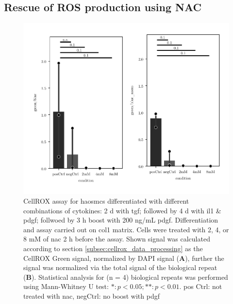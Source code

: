     \subsection{Rescue of ROS production using NAC}
        \begin{figure}[h!]
    \capstart
        \centering
    	\includegraphics{Abbildung/NAC_quench.pdf}

    	\begin{minipage}{\captionwidth}
    		\caption[NAC quench]{ \newline
            CellROX assay for \acp{haosmc} differentiated with different combinations of cytokines: 2 d with \ac{tgf}; followed by 4 d with \ac{il1} \& \ac{pdgf}; follwoed by 3 h boost with 200 ng/mL \ac{pdgf}. Differentiation and assay carried out on \ac{col1} matrix. Cells were treated with 2, 4, or 8 mM of \ac{nac} 2 h before the assay.
            Shown signal was calculated according to section \ref{subsec:cellrox_data_processing} as the CellROX Green signal, normalized by DAPI signal (\textbf{A}), further the signal was normalized via the total signal of the biological repeat (\textbf{B}). Statistical analysis for (n = 4) biological repeats was performed using Mann-Whitney U test: $*: p < 0.05; **: p < 0.01$.
            pos Ctrl: not treated with \ac{nac}, negCtrl: no boost with \ac{pdgf}}
    		\label{fig:NAC_quench}
    	\end{minipage}
    \end{figure}

